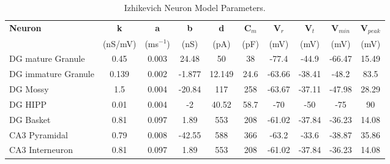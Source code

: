 \begin{table}[h!]
\centering
\renewcommand{\arraystretch}{1.4}
\begin{tabular}{lccccccccc}
\toprule
\textbf{Neuron} & \textbf{k} & \textbf{a} & \textbf{b} & \textbf{d} & \textbf{C$_m$} & \textbf{V$_r$} & \textbf{V$_t$} & \textbf{V$_{min}$} & \textbf{V$_{peak}$} \\
 & (nS/mV) & (ms$^{-1}$) & (nS) & (pA) & (pF) & (mV) & (mV) & (mV) & (mV) \\
\midrule
DG mature Granule & 0.45 & 0.003 & 24.48 & 50 & 38 & -77.4 & -44.9 & -66.47 & 15.49 \\
DG immature Granule & 0.139 & 0.002 & -1.877 & 12.149 & 24.6 & -63.66 & -38.41 & -48.2 & 83.5 \\
DG Mossy & 1.5 & 0.004 & -20.84 & 117 & 258 & -63.67 & -37.11 & -47.98 & 28.29 \\
DG HIPP & 0.01 & 0.004 & -2 & 40.52 & 58.7 & -70 & -50 & -75 & 90 \\
DG Basket & 0.81 & 0.097 & 1.89 & 553 & 208 & -61.02 & -37.84 & -36.23 & 14.08 \\
CA3 Pyramidal & 0.79 & 0.008 & -42.55 & 588 & 366 & -63.2 & -33.6 & -38.87 & 35.86 \\
CA3 Interneuron & 0.81 & 0.097 & 1.89 & 553 & 208 & -61.02 & -37.84 & -36.23 & 14.08 \\
\bottomrule
\end{tabular}
\caption{Izhikevich Neuron Model Parameters.}
\label{tab:izhikevich_neuron_params}
\end{table}